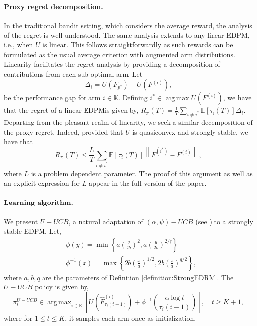 \documentclass[final,12pt]{colt2018}
\newcommand{\prn}[1]{\left( #1 \right)}
\newcommand{\brc}[1]{\left\lbrace #1 \right\rbrace}
\newcommand{\brk}[1]{\left\lbrack #1 \right\rbrack}
\newcommand{\norm}[1]{\left\lVert #1 \right\rVert}
\newcommand{\EEBrk}[2][]{\mathbb{E}_{#1}\brk{#2}}
\DeclareMathOperator*{\argmax}{arg\,max}
\newcommand{\EDRMabbrv}{EDPM}
\newcommand{\UUCB}{\RHat-UCB}
\newcommand{\policy}[1][]{\pi^{#1}}
\newcommand{\policyAt}[2][]{\policy[#1]_{#2}}
\newcommand{\RHat}[1][]{{U}^{#1}}
\newcommand{\RHatFunc}[2][]{\RHat[{#1}] \prn{#2}}
\newcommand{\FHatPi}[2][\policy]{\hat{F}_{#2}^{#1}}
\newcommand{\FpOpt}{F_{p^*}}
\newcommand{\Fi}[1][i]{F^{\prn{{#1}}}}
\newcommand{\FiOpt}{F^{(i^*)}}
\newcommand{\actionSet}{\mathds{K}}
\newcommand{\tauIAt}[2][i]{\tau_{#1} \prn{#2}}
\newcommand{\tauI}[1][i]{\tauIAt[#1]{T}}
\newcommand{\regret}[1][\policy]{R_{#1}\prn{T}}
\newcommand{\pseudoRegret}[1][\policy]{\bar{R}_{#1}\prn{T}}
\newcommand{\polyContModCoeff}{b}
\newcommand{\polyContModDeg}{q}
\newcommand{\lipConst}{L}
\newcommand{\concentrationConst}{a}
\newcommand{\phiFunc}{\phi}
\newcommand{\phiFuncAt}[1]{\phiFunc\prn{#1}}
\newcommand{\phiInvFunc}{\phi^{-1}}
\newcommand{\phiInvFuncAt}[1]{\phiInvFunc\prn{#1}}
\newcommand{\Di}{\Delta_i}
\begin{document}
	\paragraph{Proxy regret decomposition.} In the traditional bandit setting, which considers the average reward, the analysis of the regret is well understood. The same analysis extends to any linear \EDRMabbrv, i.e., when $\RHat$ is linear. This follows straightforwardly as such rewards can be formulated as the usual average criterion with augmented arm distributions. Linearity facilitates the regret analysis by providing a decomposition of contributions from each sub-optimal arm. Let
	\begin{equation*}
	\Di = \RHatFunc{\FpOpt} - \RHatFunc{\Fi},
	\end{equation*}
	be the performance gap for arm $i \in \actionSet$. Defining $i^* \in \argmax \RHatFunc{\Fi}$, we have that the regret of a linear \EDRMabbrv\space is given by, $\regret = \frac{1}{T}\sum_{i \neq i^*}\EEBrk{\tauI} \Di$.
	Departing from the pleasant realm of linearity, we seek a similar decomposition of the proxy regret. Indeed, provided that $\RHat$ is quasiconvex and strongly stable, we have that		\begin{equation}\label{eq:proxyRegretDecomp}
		\pseudoRegret \le \frac{\lipConst}{T} \sum_{i \neq i^*} \EEBrk{\tauI} \norm{\FiOpt - \Fi},
	\end{equation}
	where $\lipConst$ is a problem dependent parameter. The proof of this argument as well as an explicit expression for $\lipConst$ appear in the full version of the paper.
	

%	
	
	
	
	
	
	\paragraph{Learning algorithm.} We present $\UUCB$, a natural adaptation of $\prn{\alpha,\psi}-UCB$ (see \cite{bubeck2012regret}) to a strongly stable \EDRMabbrv. Let,
	\begin{align*}
	&\phiFuncAt{y}
	= \min \brc{\concentrationConst \prn{\frac{y}{2 \polyContModCoeff}}^2, \concentrationConst \prn{\frac{y}{2 \polyContModCoeff}}^{2 / \polyContModDeg}} \\
	&\phiInvFuncAt{x}
	= \max \brc{2\polyContModCoeff \prn{\frac{x}{\concentrationConst}}^{1/2}, 2\polyContModCoeff \prn{\frac{x}{\concentrationConst}}^{\polyContModDeg / 2}},
	\end{align*}
	where $\concentrationConst, \polyContModCoeff, \polyContModDeg$ are the parameters of Definition \ref{definition:StrongEDRM}. The $\UUCB$ policy is given by,
	\begin{equation}
	\policyAt[\UUCB]{t} \in \argmax_{i \in \actionSet} \brk{\RHatFunc{\FHatPi[(i)]{\tauIAt{t-1}}} + \phiInvFuncAt{\frac{\alpha \log t}{\tauIAt{t-1}}}}, \quad t \ge K+1,
	\end{equation}
	where for $1 \le t \le K$, it samples each arm once as initialization.
	
\end{document}
